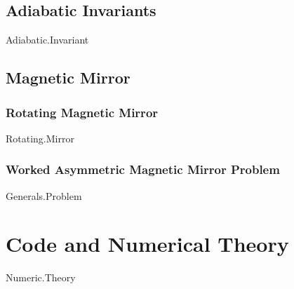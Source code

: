 \documentclass[12pt]{article}
\let\oldsection\section
\renewcommand\section{\clearpage\oldsection}
\begin{document}
\subsection{Adiabatic Invariants}
{Adiabatic.Invariant}
\subsection{Magnetic Mirror}
\subsubsection{Rotating Magnetic Mirror}
{Rotating.Mirror}
\subsubsection{Worked Asymmetric Magnetic Mirror Problem}\label{subsecgenexam}
{Generals.Problem}
\section{Code and Numerical Theory}
{Numeric.Theory}



\end{document}
